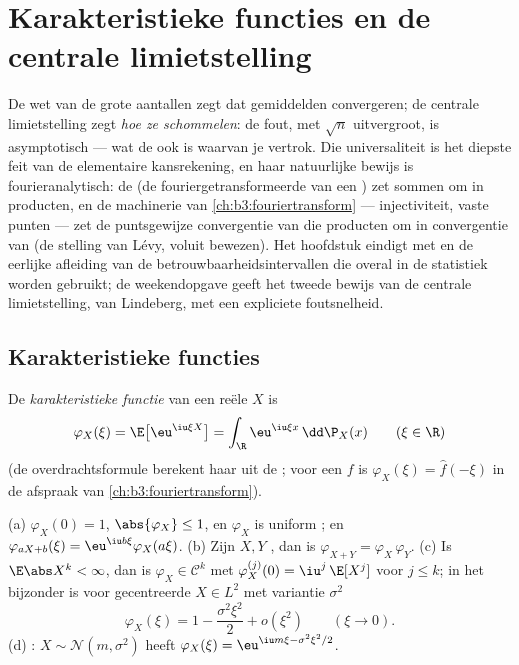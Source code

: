 \chapter{Karakteristieke functies en de centrale
limietstelling}\label{ch:b3:clt}

De wet van de grote aantallen zegt dat gemiddelden convergeren;
de centrale limietstelling zegt \emph{hoe ze schommelen}: de
fout, met $\sqrt n$ uitvergroot, is asymptotisch  ---
wat de  ook is waarvan je vertrok. Die universaliteit is
het diepste feit van de elementaire kansrekening, en haar
natuurlijke bewijs is fourieranalytisch: de \emph{} (de fouriergetransformeerde van een ) zet
 sommen om in producten, en de machinerie van
\cref{ch:b3:fouriertransform} --- injectiviteit,  vaste
punten --- zet de puntsgewijze convergentie van die producten om
in convergentie van  (de stelling van Lévy, voluit
bewezen). Het hoofdstuk eindigt met  en de
eerlijke afleiding van de betrouwbaarheidsintervallen die overal
in de statistiek worden gebruikt; de weekendopgave geeft het
tweede bewijs van de centrale limietstelling, van Lindeberg, met
een expliciete foutsnelheid.

\section{Karakteristieke functies}

\begin{definition}\label{def:b3:clt:cf}
De \emph{karakteristieke functie}
van een reële  $X$ is
\[
\varphi_X(\xi) = \E\bigl[\eu^{\iu\xi X}\bigr]
= \int_\R \eu^{\iu\xi x}\,\dd\P_X(x)
\qquad (\xi \in \R)
\]
(de overdrachtsformule berekent haar uit de ; voor een
 $f$ is $\varphi_X(\xi) = \hat f(-\xi)$ in de afspraak
van \cref{ch:b3:fouriertransform}).
\end{definition}

\begin{proposition}\label{prop:b3:clt:cfbasics}
(a) $\varphi_X(0) = 1$, $\abs{\varphi_X} \leq 1$, en $\varphi_X$
is uniform ; en $\varphi_{aX + b}(\xi) = \eu^{\iu
b\xi}\varphi_X(a\xi)$.
(b) Zijn $X, Y$ \emph{}, dan is $\varphi_{X+Y} =
\varphi_X\,\varphi_Y$.
(c) Is $\E\abs X^k < \infty$, dan is $\varphi_X \in \mathcal C^k$
met $\varphi_X^{(j)}(0) = \iu^j\,\E[X^j]$ voor $j \leq k$; in het
bijzonder is voor gecentreerde $X \in L^2$ met variantie
$\sigma^2$
\[
\varphi_X(\xi) = 1 - \frac{\sigma^2\xi^2}{2} +
o(\xi^2) \qquad (\xi \to 0).
\]
(d) : $X \sim \mathcal N(m, \sigma^2)$ heeft
$\varphi_X(\xi) = \eu^{\iu m\xi - \sigma^2\xi^2/2}$.
\end{proposition}

